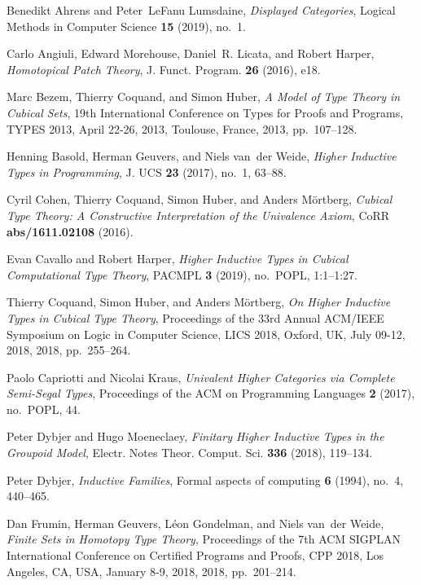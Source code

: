 \documentclass[9pt]{entcs}
\newcommand{\0}{\textbf{0}} %
\begin{document}
\begin{thebibliography}{10}
	Benedikt Ahrens and Peter~LeFanu Lumsdaine, \emph{{Displayed Categories}},
	Logical Methods in Computer Science \textbf{15} (2019), no.~1.
	
	Carlo Angiuli, Edward Morehouse, Daniel~R. Licata, and Robert Harper,
	\emph{{Homotopical Patch Theory}}, J. Funct. Program. \textbf{26} (2016),
	e18.
	
	Marc Bezem, Thierry Coquand, and Simon Huber, \emph{{A Model of Type Theory in
			Cubical Sets}}, 19th International Conference on Types for Proofs and
	Programs, {TYPES} 2013, April 22-26, 2013, Toulouse, France, 2013,
	pp.~107--128.
	
	Henning Basold, Herman Geuvers, and Niels van~der Weide, \emph{{Higher
			Inductive Types in Programming}}, J. {UCS} \textbf{23} (2017), no.~1, 63--88.
	
	Cyril Cohen, Thierry Coquand, Simon Huber, and Anders M{\"{o}}rtberg,
	\emph{{Cubical Type Theory: A Constructive Interpretation of the Univalence
			Axiom}}, CoRR \textbf{abs/1611.02108} (2016).
	
	Evan Cavallo and Robert Harper, \emph{{Higher Inductive Types in Cubical
			Computational Type Theory}}, {PACMPL} \textbf{3} (2019), no.~{POPL},
	1:1--1:27.
	
	Thierry Coquand, Simon Huber, and Anders M{\"{o}}rtberg, \emph{{On Higher
			Inductive Types in Cubical Type Theory}}, Proceedings of the 33rd Annual
	{ACM/IEEE} Symposium on Logic in Computer Science, {LICS} 2018, Oxford, UK,
	July 09-12, 2018, 2018, pp.~255--264.
	
	Paolo Capriotti and Nicolai Kraus, \emph{{Univalent Higher Categories via
			Complete Semi-Segal Types}}, Proceedings of the ACM on Programming Languages
	\textbf{2} (2017), no.~POPL, 44.
	
	Peter Dybjer and Hugo Moeneclaey, \emph{{Finitary Higher Inductive Types in the
			Groupoid Model}}, Electr. Notes Theor. Comput. Sci. \textbf{336} (2018),
	119--134.
	
	Peter Dybjer, \emph{{Inductive Families}}, Formal aspects of computing
	\textbf{6} (1994), no.~4, 440--465.
	
	Dan Frumin, Herman Geuvers, L{\'{e}}on Gondelman, and Niels van~der Weide,
	\emph{{Finite Sets in Homotopy Type Theory}}, Proceedings of the 7th {ACM}
	{SIGPLAN} International Conference on Certified Programs and Proofs, {CPP}
	2018, Los Angeles, CA, USA, January 8-9, 2018, 2018, pp.~201--214.
	

\end{thebibliography}
\end{document}
